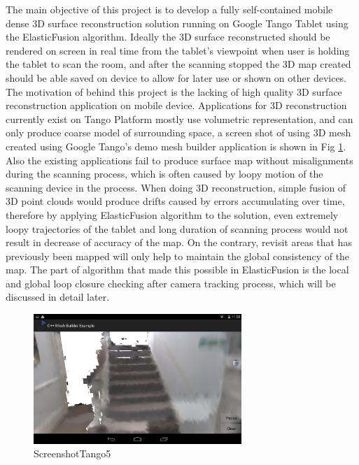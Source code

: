 \documentclass[12pt,twoside]{article}
\begin{document}
The main objective of this project is to develop a fully self-contained mobile dense 3D surface reconstruction solution running on Google Tango Tablet using the ElasticFusion algorithm. Ideally the 3D surface reconstructed should be rendered on screen in real time from the tablet's viewpoint when user is holding the tablet to scan the room, and after the scanning stopped the 3D map created should be able saved on device to allow for later use or shown on other devices. The motivation of behind this project is the lacking of high quality 3D surface reconstruction application on mobile device. Applications for 3D reconstruction currently exist on Tango Platform mostly use volumetric representation, and can only produce coarse model of surrounding space, a screen shot of using 3D mesh created using Google Tango's demo mesh builder application is shown in Fig \ref{fig:ScreenshotTango5}. Also the existing applications fail to produce surface map without misalignments during the scanning process, which is often caused by loopy motion of the scanning device in the process. When doing 3D reconstruction, simple fusion of 3D point clouds would produce drifts caused by errors accumulating over time, therefore by applying ElasticFusion algorithm to the solution, even extremely loopy trajectories of the tablet and long duration of scanning process would not result in decrease of accuracy of the map. On the contrary, revisit areas that has previously been mapped will only help to maintain the global consistency of the map. The part of algorithm that made this possible in ElasticFusion is the local and   global loop closure checking after camera tracking process, which will be discussed in detail later.\\
\begin{figure}[h]
    \centering
    \includegraphics[width=0.7\textwidth]{figures/ScreenshotTango5}
    \caption{ScreenshotTango5}
    \label{fig:ScreenshotTango5}
\end{figure}
\end{document}
